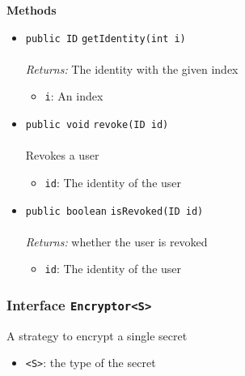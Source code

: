 \textbf{\sffamily Methods}
\begin{itemize}
\item \lstinline|public ID| \lstinline|getIdentity|\lstinline|(int i)|\\ \\[-0.6em]
\emph{Returns:} The identity with the given index
\begin{itemize}
\item \lstinline|i|: An index
\end{itemize}



\item \lstinline|public void| \lstinline|revoke|\lstinline|(ID id)|\\ \\[-0.6em]
Revokes a user
\begin{itemize}
\item \lstinline|id|: The identity of the user
\end{itemize}



\item \lstinline|public boolean| \lstinline|isRevoked|\lstinline|(ID id)|\\ \\[-0.6em]
\emph{Returns:} whether the user is revoked
\begin{itemize}
\item \lstinline|id|: The identity of the user
\end{itemize}



\end{itemize}

\subsubsection{Interface \lstinline|Encryptor<S>|}
A strategy to encrypt a single secret \\
\noindent\begin{minipage}[t]{5cm}
\vspace{0.3em}
\hspace*{2em}
\vspace{0.3em}
\end{minipage}

\begin{itemize}
\item \lstinline|<S>|: the type of the secret
\end{itemize}




